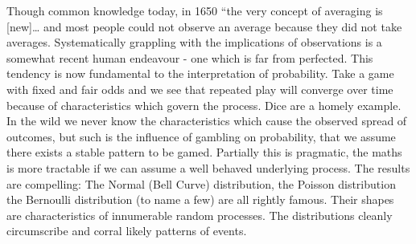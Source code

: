 \documentclass[
]{book}
\theoremstyle{definition}
\theoremstyle{definition}
\theoremstyle{definition}
\theoremstyle{remark}
\begin{document}
Though common knowledge today, in 1650 ``the very concept of averaging is {[}new{]}\ldots{} and most people could not observe an average because they did not take averages.\citep{HackingEmergence} Systematically grappling with the implications of observations is a somewhat recent human endeavour - one which is far from perfected. This tendency is now fundamental to the interpretation of probability. Take a game with fixed and fair odds and we see that repeated play will converge over time because of characteristics which govern the process. Dice are a homely example. In the wild we never know the characteristics which cause the observed spread of outcomes, but such is the influence of gambling on probability, that we assume there exists a stable pattern to be gamed. Partially this is pragmatic, the maths is more tractable if we can assume a well behaved underlying process. The results are compelling: The Normal (Bell Curve) distribution, the Poisson distribution the Bernoulli distribution (to name a few) are all rightly famous. Their shapes are characteristics of innumerable random processes. The distributions cleanly circumscribe and corral likely patterns of events.
\end{document}
